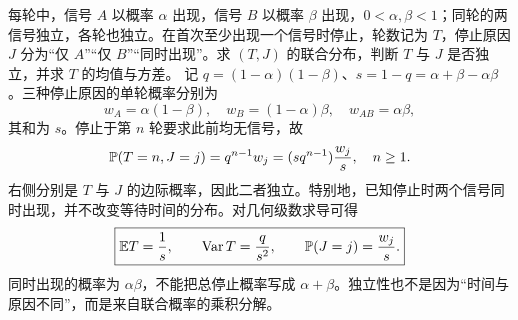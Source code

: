 每轮中，信号 $A$ 以概率 $\alpha$ 出现，信号 $B$ 以概率 $\beta$ 出现，$0<\alpha,\beta<1$；同轮的两信号独立，各轮也独立。在首次至少出现一个信号时停止，轮数记为 $T$，停止原因 $J$ 分为“仅 $A$”“仅 $B$”“同时出现”。求 $(T,J)$ 的联合分布，判断 $T$ 与 $J$ 是否独立，并求 $T$ 的均值与方差。
\solution 记 $q=(1-\alpha)(1-\beta)$、$s=1-q=\alpha+\beta-\alpha\beta$。三种停止原因的单轮概率分别为
\[
w_A=\alpha(1-\beta),\quad w_B=(1-\alpha)\beta,
\quad w_{AB}=\alpha\beta,
\]
其和为 $s$。停止于第 $n$ 轮要求此前均无信号，故
\[
\mathbb{P}(T=n,J=j)=q^{n-1}w_j
=(s q^{n-1})\frac{w_j}{s},\quad n\ge1.
\]
右侧分别是 $T$ 与 $J$ 的边际概率，因此二者独立。特别地，已知停止时两个信号同时出现，并不改变等待时间的分布。对几何级数求导可得
\[
\boxed{\mathbb{E} T=\frac1s,\qquad \operatorname{Var} T=\frac q{s^2},
\qquad \mathbb{P}(J=j)=\frac{w_j}{s}.}
\]
\pitfall 同时出现的概率为 $\alpha\beta$，不能把总停止概率写成 $\alpha+\beta$。独立性也不是因为“时间与原因不同”，而是来自联合概率的乘积分解。
